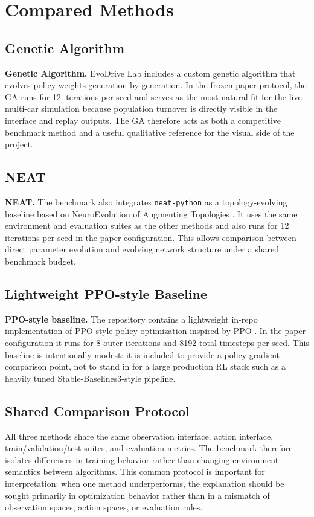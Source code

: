 \section{Compared Methods}

\subsection{Genetic Algorithm}

\textbf{Genetic Algorithm.} EvoDrive Lab includes a custom genetic algorithm that evolves policy weights generation by generation. In the frozen paper protocol, the GA runs for 12 iterations per seed and serves as the most natural fit for the live multi-car simulation because population turnover is directly visible in the interface and replay outputs. The GA therefore acts as both a competitive benchmark method and a useful qualitative reference for the visual side of the project.

\subsection{NEAT}

\textbf{NEAT.} The benchmark also integrates \texttt{neat-python} as a topology-evolving baseline based on NeuroEvolution of Augmenting Topologies \cite{stanley2002}. It uses the same environment and evaluation suites as the other methods and also runs for 12 iterations per seed in the paper configuration. This allows comparison between direct parameter evolution and evolving network structure under a shared benchmark budget.

\subsection{Lightweight PPO-style Baseline}

\textbf{PPO-style baseline.} The repository contains a lightweight in-repo implementation of PPO-style policy optimization inspired by PPO \cite{schulman2017}. In the paper configuration it runs for 8 outer iterations and 8192 total timesteps per seed. This baseline is intentionally modest: it is included to provide a policy-gradient comparison point, not to stand in for a large production RL stack such as a heavily tuned Stable-Baselines3-style pipeline.

\subsection{Shared Comparison Protocol}

All three methods share the same observation interface, action interface, train/validation/test suites, and evaluation metrics. The benchmark therefore isolates differences in training behavior rather than changing environment semantics between algorithms. This common protocol is important for interpretation: when one method underperforms, the explanation should be sought primarily in optimization behavior rather than in a mismatch of observation spaces, action spaces, or evaluation rules.
